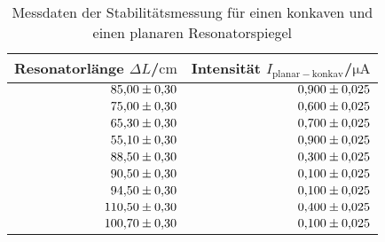 \begin{table}
 \caption{Messdaten der Stabilitätsmessung für einen konkaven und einen planaren Resonatorspiegel}
 \label{tab:stabilitaetpk}
 \centering
{} \begin{tabular}{rr}
 \toprule 
    {Resonatorlänge $\Delta L$/$\si{\centi\meter}$}& {Intensität $I_{\mathrm{planar-konkav}}$/$\si{\micro\ampere}$} \\
     \midrule
     $\num{85.00 \pm 0.30}$ & $\num{0.900\pm0.025}$ \\
     $\num{75.00 \pm 0.30}$ & $\num{0.600\pm0.025}$ \\
     $\num{65.30 \pm 0.30}$ & $\num{0.700\pm0.025}$ \\
     $\num{55.10 \pm 0.30}$ & $\num{0.900\pm0.025}$ \\
     $\num{88.50 \pm 0.30}$ & $\num{0.300\pm0.025}$ \\
     $\num{90.50 \pm 0.30}$ & $\num{0.100\pm0.025}$ \\
     $\num{94.50 \pm 0.30}$ & $\num{0.100\pm0.025}$ \\
     $\num{110.50 \pm 0.30}$ & $\num{0.400\pm0.025}$ \\
     $\num{100.70 \pm 0.30}$ & $\num{0.100\pm0.025}$ \\
 \bottomrule
 \end{tabular}
\end{table}